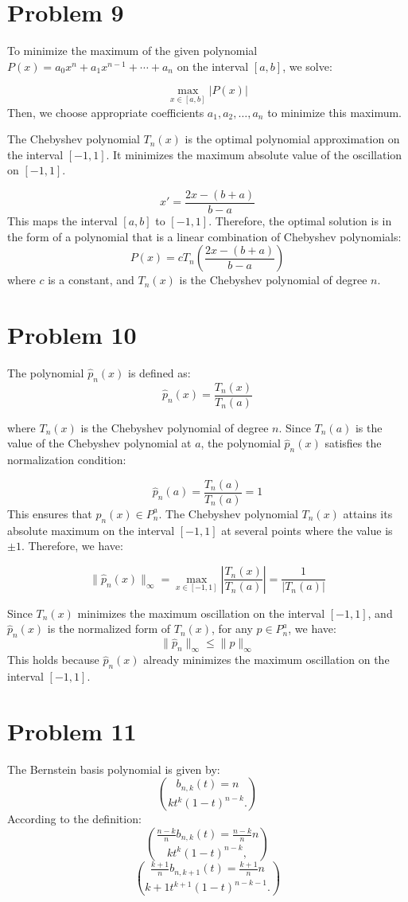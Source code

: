 \documentclass{article}
\begin{document}
\section*{Problem 9}
To minimize the maximum of the given polynomial \( P(x) = a_0 x^n + a_1 x^{n-1} + \cdots + a_n \) on the interval \( [a, b] \), we solve:

\[\max_{x \in [a, b]} \left| P(x) \right|\]
Then, we choose appropriate coefficients \( a_1, a_2, \dots, a_n \) to minimize this maximum.

The Chebyshev polynomial \( T_n(x) \) is the optimal polynomial approximation on the interval \( [-1, 1] \). It minimizes the maximum absolute value of the oscillation on \( [-1, 1] \).

\[x' = \frac{2x - (b + a)}{b - a}\]This maps the interval \( [a, b] \) to \( [-1, 1] \). 
Therefore, the optimal solution is in the form of a polynomial that is a linear combination of Chebyshev polynomials:
\[P(x) = c T_n\left( \frac{2x - (b + a)}{b - a} \right)\]
where \( c \) is a constant, and \( T_n(x) \) is the Chebyshev polynomial of degree \( n \).

\section*{Problem 10}
The polynomial \( \hat{p}_n(x) \) is defined as:
\[\hat{p}_n(x) = \frac{T_n(x)}{T_n(a)}\]

where \( T_n(x) \) is the Chebyshev polynomial of degree \( n \). Since \( T_n(a) \) is the value of the Chebyshev polynomial at \( a \), the polynomial \( \hat{p}_n(x) \) satisfies the normalization condition:

\[\hat{p}_n(a) = \frac{T_n(a)}{T_n(a)} = 1\]
This ensures that \( \hat{p}_n(x) \in P_n^a \).
The Chebyshev polynomial \( T_n(x) \) attains its absolute maximum on the interval \( [-1, 1] \) at several points where the value is \( \pm 1 \). Therefore, we have:

\[\|\hat{p}_n(x)\|_\infty = \max_{x \in [-1,1]} \left| \frac{T_n(x)}{T_n(a)} \right| = \frac{1}{|T_n(a)|}\]

Since \( T_n(x) \) minimizes the maximum oscillation on the interval \( [-1, 1] \), and \( \hat{p}_n(x) \) is the normalized form of \( T_n(x) \), for any \( p \in P_n^a \), we have:
\[\|\hat{p}_n\|_\infty \leq \|p\|_\infty\]
This holds because \( \hat{p}_n(x) \) already minimizes the maximum oscillation on the interval \( [-1, 1] \).


\section*{Problem 11}
The Bernstein basis polynomial is given by:
\[b_{n,k}(t) = {n}\choose{k} t^k (1-t)^{n-k}.\]
According to the definition:
\[\frac{n-k}{n} b_{n,k}(t) = \frac{n-k}{n} {n}\choose{k} t^k (1-t)^{n-k},\]
\[\frac{k+1}{n} b_{n,k+1}(t) = \frac{k+1}{n} {n}\choose{k+1} t^{k+1} (1-t)^{n-k-1}.\]
\end{document}

